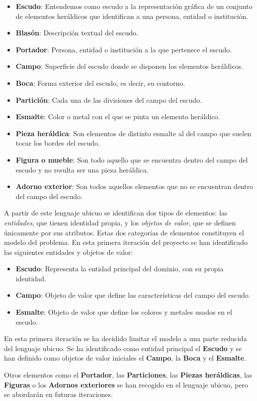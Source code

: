 \begin{itemize}
    \item \textbf{Escudo}: Entendemos como escudo a la representación gráfica de un conjunto de
    elementos heráldicos que identifican a una persona, entidad o institución.
    \item \textbf{Blasón}: Descripción textual del escudo.
    \item \textbf{Portador}: Persona, entidad o institución a la que pertenece el escudo.
    \item \textbf{Campo}: Superficie del escudo donde se disponen los elementos heráldicos.
    \item \textbf{Boca}: Forma exterior del escudo, es decir, su contorno.
    \item \textbf{Partición}: Cada una de las divisiones del campo del escudo. 
    \item \textbf{Esmalte}: Color o metal con el que se pinta un elemento heráldico.
    \item \textbf{Pieza heráldica}: Son elementos de distinto esmalte al del campo que suelen tocar
    los bordes del escudo.
    \item \textbf{Figura o mueble}: Son todo aquello que se encuentra dentro del campo del escudo y
    no resulta ser una pieza heráldica.
    \item \textbf{Adorno exterior}: Son todos aquellos elementos que no se encuentran dentro del campo
    del escudo.
\end{itemize}

A partir de este lenguaje ubicuo se identifican dos tipos de elementos: las \textit{entidades}, que
tienen identidad propia, y los \textit{objetos de valor}, que se definen únicamente por sus atributos.
Estas dos categorías de elementos constituyen el modelo del problema. En esta primera iteración del
proyecto se han identificado las siguientes entidades y objetos de valor:

\begin{itemize}
    \item \textbf{Escudo}: Representa la entidad principal del dominio, con su propia identidad.
    \item \textbf{Campo}: Objeto de valor que define las características del campo del escudo.
    \item \textbf{Esmalte}: Objeto de valor que define los colores y metales usados en el escudo.
\end{itemize}

En esta primera iteración se ha decidido limitar el modelo a una parte reducida del lenguaje ubicuo. 
Se ha identificado como entidad principal el \textbf{Escudo} y se han definido como objetos de valor 
iniciales el \textbf{Campo}, la \textbf{Boca} y el \textbf{Esmalte}. 

Otros elementos como el \textbf{Portador}, las \textbf{Particiones}, las \textbf{Piezas heráldicas}, 
las \textbf{Figuras} o los \textbf{Adornos exteriores} se han recogido en el lenguaje ubicuo, pero se 
abordarán en futuras iteraciones.
